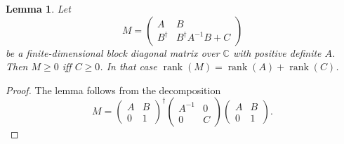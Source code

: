 \documentclass[american,aps,pra,reprint,floatfix,nofootinbib,superscriptaddress]{revtex4-2}
\DeclareMathOperator{\rank}{rank}
\newtheorem{lemma}[theorem]{Lemma}
\begin{document}
\begin{lemma}
  \label{lm:block-diagonal}
  Let
  \begin{equation}
    M = \begin{pmatrix}A & B \\ B^{\dagger} & B^{\dagger} A^{-1} B + C\end{pmatrix}
  \end{equation}
  be a finite-dimensional block diagonal matrix over $\mathbb{C}$ with
  positive definite $A$.
  Then $M \geq 0$ iff $C \geq 0$.
  In that case $\rank(M) = \rank(A) + \rank(C)$.
\end{lemma}
\begin{proof}
  The lemma follows from the decomposition
  \begin{equation}
    M =
      \begin{pmatrix}A & B \\ 0 & 1\end{pmatrix}^{\dagger}
      \begin{pmatrix}A^{-1} & 0 \\ 0 & C\end{pmatrix}
      \begin{pmatrix}A & B \\ 0 & 1\end{pmatrix}.
  \end{equation}
\end{proof}
\end{document}

